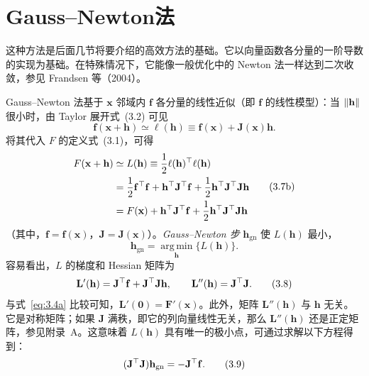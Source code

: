 \section{Gauss--Newton法}
这种方法是后面几节将要介绍的高效方法的基础。它以向量函数各分量的一阶导数的实现为基础。在特殊情况下，它能像一般优化中的 Newton 法一样达到二次收敛，参见 Frandsen 等（2004）。

Gauss--Newton 法基于 $\mathbf{x}$ 邻域内 $\mathbf{f}$ 各分量的线性近似（即 $\mathbf{f}$ 的线性模型）：当 $\lVert\mathbf{h}\rVert$ 很小时，由 Taylor 展开式~(3.2) 可见
\begin{equation}
  \mathbf{f}(\mathbf{x}+\mathbf{h})\simeq\ell(\mathbf{h})
  \equiv\mathbf{f}(\mathbf{x})+\mathbf{J}(\mathbf{x})\mathbf{h}.
  \tag{3.7a}\label{eq:3.7a}
\end{equation}
将其代入 $F$ 的定义式~(3.1)，可得
\begin{equation}
  \begin{aligned}
    F(\mathbf{x}+\mathbf{h})&\simeq L(\mathbf{h})
      \equiv\frac12\ell(\mathbf{h})^{\top}\ell(\mathbf{h})\\
    &=\frac12\mathbf{f}^{\top}\mathbf{f}+\mathbf{h}^{\top}\mathbf{J}^{\top}\mathbf{f}
      +\frac12\mathbf{h}^{\top}\mathbf{J}^{\top}\mathbf{J}\mathbf{h}\\
    &=F(\mathbf{x})+\mathbf{h}^{\top}\mathbf{J}^{\top}\mathbf{f}
      +\frac12\mathbf{h}^{\top}\mathbf{J}^{\top}\mathbf{J}\mathbf{h}
  \end{aligned}
  \tag{3.7b}\label{eq:3.7b}
\end{equation}
（其中，$\mathbf{f}=\mathbf{f}(\mathbf{x})$，$\mathbf{J}=\mathbf{J}(\mathbf{x})$）。\emph{Gauss--Newton 步} $\mathbf{h}_{\mathrm{gn}}$ 使 $L(\mathbf{h})$ 最小，
\[
  \mathbf{h}_{\mathrm{gn}}=\operatorname*{arg\,min}_{\mathbf{h}}\{L(\mathbf{h})\}.
\]
容易看出，$L$ 的梯度和 Hessian 矩阵为
\begin{equation}
  \mathbf{L}'(\mathbf{h})=\mathbf{J}^{\top}\mathbf{f}+\mathbf{J}^{\top}\mathbf{J}\mathbf{h},
  \qquad \mathbf{L}''(\mathbf{h})=\mathbf{J}^{\top}\mathbf{J}.
  \tag{3.8}\label{eq:3.8}
\end{equation}
与式~\eqref{eq:3.4a} 比较可知，$\mathbf{L}'(\mathbf{0})=\mathbf{F}'(\mathbf{x})$。此外，矩阵 $\mathbf{L}''(\mathbf{h})$ 与 $\mathbf{h}$ 无关。它是对称矩阵；如果 $\mathbf{J}$ 满秩，即它的列向量线性无关，那么 $\mathbf{L}''(\mathbf{h})$ 还是正定矩阵，参见附录~A。这意味着 $L(\mathbf{h})$ 具有唯一的极小点，可通过求解以下方程得到：
\begin{equation}
  (\mathbf{J}^{\top}\mathbf{J})\mathbf{h}_{\mathrm{gn}}=-\mathbf{J}^{\top}\mathbf{f}.
  \tag{3.9}\label{eq:3.9}
\end{equation}

